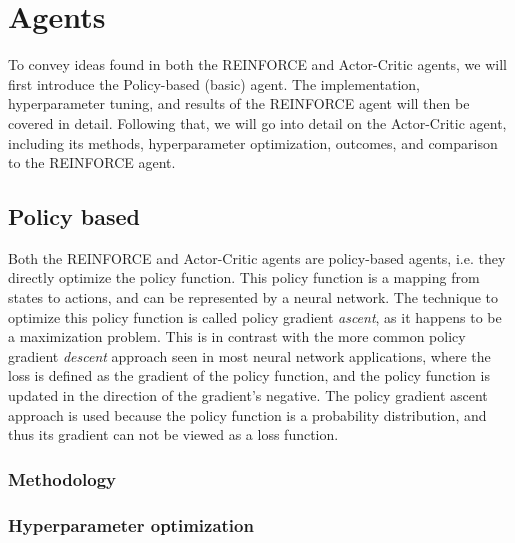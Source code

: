 \documentclass{article}
\begin{document}
\section{Agents}
\label{Agents}

To convey ideas found in both the REINFORCE and Actor-Critic agents, we will first introduce the Policy-based (basic) agent.
The implementation, hyperparameter tuning, and results of the REINFORCE agent will then be covered in detail.
Following that, we will go into detail on the Actor-Critic agent, including its methods, hyperparameter optimization, outcomes, and comparison to the REINFORCE agent.

\subsection{Policy based}
\label{A-PolicyBased}

Both the REINFORCE and Actor-Critic agents are policy-based agents, i.e. they directly optimize the policy function.
This policy function is a mapping from states to actions, and can be represented by a neural network.
The technique to optimize this policy function is called policy gradient \textit{ascent}, as it happens to be a maximization problem.
This is in contrast with the more common policy gradient \textit{descent} approach seen in most neural network applications, where the loss is defined as the gradient of the policy function, and the policy function is updated in the direction of the gradient's negative.
The policy gradient ascent approach is used because the policy function is a probability distribution, and thus its gradient can not be viewed as a loss function.

\subsubsection{Methodology}
\label{PB-Method}



\subsubsection{Hyperparameter optimization}
\label{PB-Method}


\end{document}
